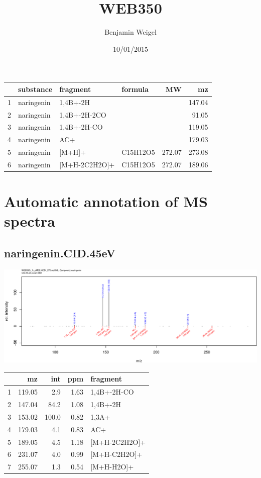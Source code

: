 \documentclass[]{article}
\title{WEB350}
\author{Benjamin Weigel}
\date{10/01/2015}
\begin{document}
\maketitle


\tableofcontents\clearpage

\begin{table}[ht]
\centering
\begin{tabular}{rlllrr}
  \toprule
 & substance & fragment & formula & MW & mz \\ 
  \midrule
1 & naringenin & 1,4B+-2H &  &  & 147.04 \\ 
  2 & naringenin & 1,4B+-2H-2CO &  &  & 91.05 \\ 
  3 & naringenin & 1,4B+-2H-CO &  &  & 119.05 \\ 
  4 & naringenin & AC+ &  &  & 179.03 \\ 
  5 & naringenin & [M+H]+ & C15H12O5 & 272.07 & 273.08 \\ 
  6 & naringenin & [M+H-2C2H2O]+ & C15H12O5 & 272.07 & 189.06 \\ 
   \bottomrule
\end{tabular}
\end{table}

\section{Automatic annotation of MS
spectra}\label{automatic-annotation-of-ms-spectra}

\subsection{naringenin.CID.45eV}

\includegraphics[width=\textwidth]{WEB350_files/figure-latex/unnamed-chunk-3-1}

\begin{table}[ht]
\centering
\begin{tabular}{rrrrl}
  \toprule
 & mz & int & ppm & fragment \\ 
  \midrule
1 & 119.05 & 2.9 & 1.63 & 1,4B+-2H-CO \\ 
  2 & 147.04 & 84.2 & 1.08 & 1,4B+-2H \\ 
  3 & 153.02 & 100.0 & 0.82 & 1,3A+ \\ 
  4 & 179.03 & 4.1 & 0.83 & AC+ \\ 
  5 & 189.05 & 4.5 & 1.18 & [M+H-2C2H2O]+ \\ 
  6 & 231.07 & 4.0 & 0.99 & [M+H-C2H2O]+ \\ 
  7 & 255.07 & 1.3 & 0.54 & [M+H-H2O]+ \\ 
   \bottomrule
\end{tabular}
\end{table}
\end{document}

